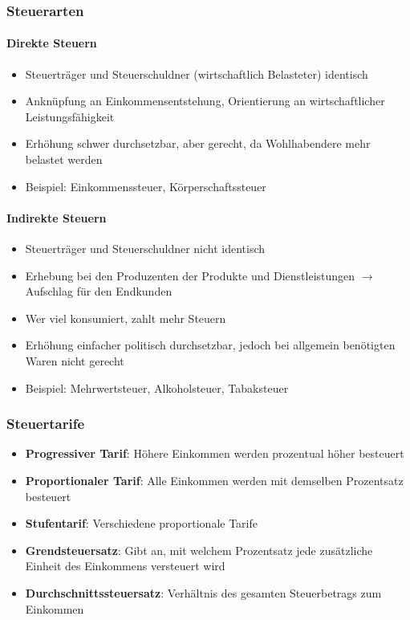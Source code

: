 \documentclass[titlepage,parskip=half]{scrartcl}
\begin{document}
\subsubsection{Steuerarten}
\paragraph{Direkte Steuern}
\begin{itemize}
    \item Steuerträger und Steuerschuldner (wirtschaftlich Belasteter) identisch
    \item Anknüpfung an Einkommensentstehung, Orientierung an wirtschaftlicher Leistungsfähigkeit
    \item Erhöhung schwer durchsetzbar, aber gerecht, da Wohlhabendere mehr belastet werden
    \item Beispiel: Einkommenssteuer, Körperschaftssteuer
\end{itemize}

\paragraph{Indirekte Steuern}
\begin{itemize}
    \item Steuerträger und Steuerschuldner nicht identisch
    \item Erhebung bei den Produzenten der Produkte und Dienstleistungen $\rightarrow$ Aufschlag für den Endkunden
    \item Wer viel konsumiert, zahlt mehr Steuern
    \item Erhöhung einfacher politisch durchsetzbar, jedoch bei allgemein benötigten Waren nicht gerecht
    \item Beispiel: Mehrwertsteuer, Alkoholsteuer, Tabaksteuer
\end{itemize}

\subsubsection{Steuertarife}
\begin{itemize}
    \item \textbf{Progressiver Tarif}: Höhere Einkommen werden prozentual höher besteuert
    \item \textbf{Proportionaler Tarif}: Alle Einkommen werden mit demselben Prozentsatz besteuert
    \item \textbf{Stufentarif}: Verschiedene proportionale Tarife
    \item \textbf{Grendsteuersatz}: Gibt an, mit welchem Prozentsatz jede zusätzliche Einheit des Einkommens versteuert wird
    \item \textbf{Durchschnittssteuersatz}: Verhältnis des gesamten Steuerbetrags zum Einkommen
\end{itemize}
\end{document}
